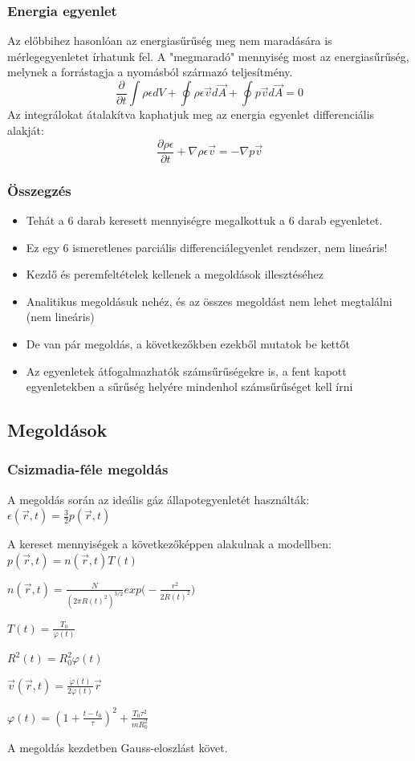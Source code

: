 \documentclass{beamer}
\begin{document}
\begin{frame}
\frametitle{Energia egyenlet}
Az előbbihez hasonlóan az energiasűrűség meg nem maradására is mérlegegyenletet írhatunk fel. A "megmaradó" mennyiség most az energiasűrűség, melynek a forrástagja a nyomásból származó teljesítmény.
\begin{equation*}
\frac{\partial}{\partial t}\int \rho\epsilon dV+\oint \rho\epsilon\vec{v}d\vec{A}+\oint p\vec{v} d\vec{A}=0
\end{equation*}
Az integrálokat átalakítva kaphatjuk meg az energia egyenlet differenciális alakját:
\begin{equation*}
\frac{\partial\rho \epsilon}{\partial t}+\nabla\rho\epsilon\vec{v}=-\nabla p\vec{v}
\end{equation*}
\end{frame}

\begin{frame}
\frametitle{Összegzés}
\begin{itemize}
\item Tehát a 6 darab keresett mennyiségre megalkottuk a 6 darab egyenletet.
\item Ez egy 6 ismeretlenes parciális differenciálegyenlet rendszer, nem lineáris!
\item Kezdő és peremfeltételek kellenek a megoldások illesztéséhez
\item Analitikus megoldásuk nehéz, és az összes megoldást nem lehet megtalálni (nem lineáris)
\item De van pár megoldás, a következőkben ezekből mutatok be kettőt
\item Az egyenletek átfogalmazhatók számsűrűségekre is, a fent kapott egyenletekben a sűrűség helyére mindenhol számsűrűséget kell írni
\end{itemize}
\end{frame}

\subsection{Megoldások}

\begin{frame}
\frametitle{Csizmadia-féle megoldás}
A megoldás során az ideális gáz állapotegyenletét használták: $\epsilon(\vec{r},t)=\frac{3}{2}p(\vec{r},t)$
\newline

A kereset mennyiségek a következőképpen alakulnak a modellben:
$p(\vec{r},t)=n(\vec{r},t)T(t)$

$n(\vec{r},t)=\frac{N}{(2\pi R(t)^2)^{3/2}}exp\big(-\frac{r^2}{2R(t)^2}\big)$

$T(t)=\frac{T_0}{\varphi(t)}$

$R^2(t)=R_0^2\varphi(t)$

$\vec{v}(\vec{r},t)=\frac{\dot{\varphi}(t)}{2\varphi(t)}\vec{r}$

$\varphi(t)=(1+\frac{t-t_0}{\tau})^2+\frac{T_0\tau^2}{mR_0^2}$

A megoldás kezdetben Gauss-eloszlást követ.
\end{frame}
\end{document}

